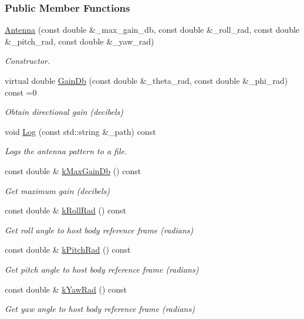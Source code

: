 \subsubsection*{Public Member Functions}
\begin{DoxyCompactItemize}
\item 
\hyperlink{classosse_1_1collaborate_1_1_antenna_a0f871800c6102bc92a2bda159f43b240}{Antenna} (const double \&\+\_\+max\+\_\+gain\+\_\+db, const double \&\+\_\+roll\+\_\+rad, const double \&\+\_\+pitch\+\_\+rad, const double \&\+\_\+yaw\+\_\+rad)
\begin{DoxyCompactList}\small\item\em Constructor. \end{DoxyCompactList}\item 
virtual double \hyperlink{classosse_1_1collaborate_1_1_antenna_a67214b4b28f3d48931c8fb435cc1f85d}{Gain\+Db} (const double \&\+\_\+theta\+\_\+rad, const double \&\+\_\+phi\+\_\+rad) const =0
\begin{DoxyCompactList}\small\item\em Obtain directional gain (decibels) \end{DoxyCompactList}\item 
void \hyperlink{classosse_1_1collaborate_1_1_antenna_ae24d52fa84fd3acff597c56259f4aba6}{Log} (const std\+::string \&\+\_\+path) const
\begin{DoxyCompactList}\small\item\em Logs the antenna pattern to a file. \end{DoxyCompactList}\item 
const double \& \hyperlink{classosse_1_1collaborate_1_1_antenna_a0666d28c6d44c193d4abd844a04044b4}{k\+Max\+Gain\+Db} () const
\begin{DoxyCompactList}\small\item\em Get maximum gain (decibels) \end{DoxyCompactList}\item 
const double \& \hyperlink{classosse_1_1collaborate_1_1_antenna_ac6602825c2e7282bc89f01b45f3289b7}{k\+Roll\+Rad} () const
\begin{DoxyCompactList}\small\item\em Get roll angle to host body reference frame (radians) \end{DoxyCompactList}\item 
const double \& \hyperlink{classosse_1_1collaborate_1_1_antenna_a3216890f8adcd7f52bbf9af7fef2f45f}{k\+Pitch\+Rad} () const
\begin{DoxyCompactList}\small\item\em Get pitch angle to host body reference frame (radians) \end{DoxyCompactList}\item 
const double \& \hyperlink{classosse_1_1collaborate_1_1_antenna_a79acbd84d9ad9a739ec0a8c60b49bc93}{k\+Yaw\+Rad} () const
\begin{DoxyCompactList}\small\item\em Get yaw angle to host body reference frame (radians) \end{DoxyCompactList}\end{DoxyCompactItemize}
